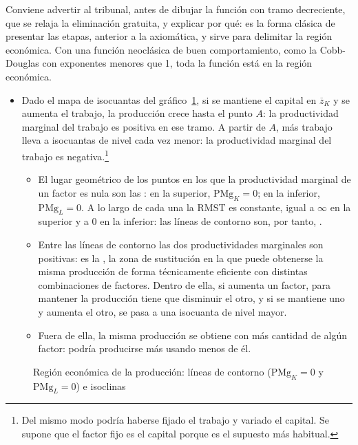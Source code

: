 \documentclass[11pt]{article}
\begin{document}
\begin{notaopositor}
Conviene advertir al tribunal, antes de dibujar la función con tramo decreciente, que se relaja la eliminación gratuita, y explicar por qué: es la forma clásica de presentar las etapas, anterior a la axiomática, y sirve para delimitar la región económica. Con una función neoclásica de buen comportamiento, como la Cobb-Douglas con exponentes menores que 1, toda la función está en la región económica.
\end{notaopositor}

\begin{itemize}
\item Dado el mapa de isocuantas del gráfico~\ref{fig:region-economica}, si se mantiene el capital en $\overline{z}_K$ y se aumenta el trabajo, la producción crece hasta el punto $A$: la productividad marginal del trabajo es positiva en ese tramo. A partir de $A$, más trabajo lleva a isocuantas de nivel cada vez menor: la productividad marginal del trabajo es negativa.\footnote{Del mismo modo podría haberse fijado el trabajo y variado el capital. Se supone que el factor fijo es el capital porque es el supuesto más habitual.}
  \begin{itemize}
  \item El lugar geométrico de los puntos en los que la productividad marginal de un factor es nula son las : en la superior, $\mathrm{PMg}_K=0$; en la inferior, $\mathrm{PMg}_L=0$. A lo largo de cada una la RMST es constante, igual a $\infty$ en la superior y a $0$ en la inferior: las líneas de contorno son, por tanto, .
  \item Entre las líneas de contorno las dos productividades marginales son positivas: es la , la zona de sustitución en la que puede obtenerse la misma producción de forma técnicamente eficiente con distintas combinaciones de factores. Dentro de ella, si aumenta un factor, para mantener la producción tiene que disminuir el otro, y si se mantiene uno y aumenta el otro, se pasa a una isocuanta de nivel mayor.
  \item Fuera de ella, la misma producción se obtiene con más cantidad de algún factor: podría producirse más usando menos de él.
  \end{itemize}
\end{itemize}

\begin{figure}[H]
\centering
\caption{Región económica de la producción: líneas de contorno ($\mathrm{PMg}_K=0$ y $\mathrm{PMg}_L=0$) e isoclinas}\label{fig:region-economica}
\end{figure}
\end{document}
